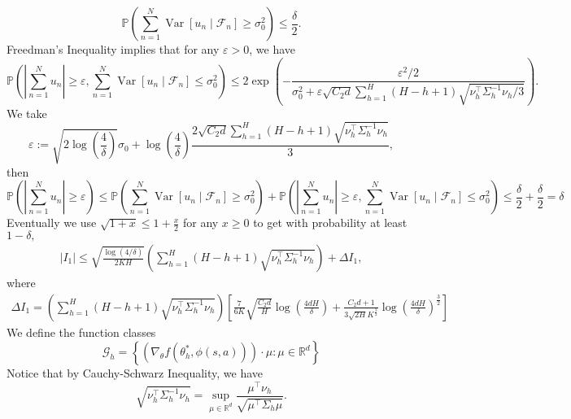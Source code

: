 \documentclass{article}
\numberwithin{equation}{section}
\theoremstyle{plain}
\theoremstyle{definition}
\theoremstyle{remark}
\begin{document}
\begin{equation*}
    \mathbb{P}\left(\sum_{n=1}^{N} \operatorname{Var}\left[u_{n} \mid \mathcal{F}_{n}\right] \geq \sigma^{2}_0\right) \leq \frac{\delta}{2}.
\end{equation*}
Freedman's Inequality implies that for any $\varepsilon>0$, we have
$$
\mathbb{P}\left(\left|\sum_{n=1}^{N} u_{n}\right| \geq \varepsilon, \sum_{n=1}^{N} \operatorname{Var}\left[u_{n} \mid \mathcal{F}_{n}\right] \leq \sigma^{2}_0\right) \leq 2 \exp \left(-\frac{\varepsilon^{2} / 2}{\sigma^{2}_0+\varepsilon \sqrt{C_{2} d} \sum_{h=1}^{H}(H-h+1) \sqrt{\nu_{h}^{\top} \Sigma_{h}^{-1} \nu_{h} / 3}}\right) .
$$
We take
$$
\varepsilon:=\sqrt{2 \log \left(\frac{4}{\delta}\right)} \sigma_0+\log \left(\frac{4}{\delta}\right) \frac{2 \sqrt{C_{2} d} \sum_{h=1}^{H}(H-h+1) \sqrt{\nu_{h}^{\top} \Sigma_{h}^{-1} \nu_{h}}}{3},
$$
then
$$
\mathbb{P}\left(\left|\sum_{n=1}^{N} u_{n}\right| \geq \varepsilon\right) \leq \mathbb{P}\left(\sum_{n=1}^{N} \operatorname{Var}\left[u_{n} \mid \mathcal{F}_{n}\right] \geq \sigma^{2}_0\right)+\mathbb{P}\left(\left|\sum_{n=1}^{N} u_{n}\right| \geq \varepsilon, \sum_{n=1}^{N} \operatorname{Var}\left[u_{n} \mid \mathcal{F}_{n}\right] \leq \sigma^{2}_0\right) \leq \frac{\delta}{2}+\frac{\delta}{2}=\delta
$$
Eventually we use $\sqrt{1+x} \leq 1+ \frac{x}{2}$ for any $x \geq 0$ to get with probability at least $1-\delta,$
\begin{align*}
    \left|I_1\right| \leq \sqrt{\frac{\log(4/\delta)}{2KH}} \left(\sum_{h=1}^H (H-h+1) \sqrt{\nu_{h}^{\top} \Sigma_{h}^{-1}\nu_{h}}\right) + \Delta I_1,
\end{align*}
where
\begin{align*}
    \Delta I_1 = \left(\sum_{h=1}^H (H-h+1) \sqrt{\nu_{h}^{\top} \Sigma_{h}^{-1}\nu_{h}}\right) \left[\frac{7}{6K}\sqrt{\frac{C_2 d}{H}} \log\left(\frac{4d H}{\delta}\right) + \frac{C_2d+1}{3 \sqrt{2H} K^{\frac{3}{2}}} \log\left(\frac{4dH}{\delta}\right)^{\frac{3}{2}}\right]
\end{align*}
We define the function classes
\begin{equation}
    \mathcal{G}_h = \left\{\left(\nabla_{\theta} f\left(\theta_{h}^*, \phi(s, a)\right)\right)\cdot \mu: \mu \in \mathbb{R}^d\right\}
\end{equation}
Notice that by Cauchy-Schwarz Inequality, we have
\begin{equation*}
    \sqrt{\nu_h^{\top} \Sigma_h^{-1} \nu_h} = \sup_{\mu \in \mathbb{R}^d} \frac{\mu^{\top} \nu_h}{\sqrt{\mu^{\top} \Sigma_h \mu}}.
\end{equation*}
\end{document}
